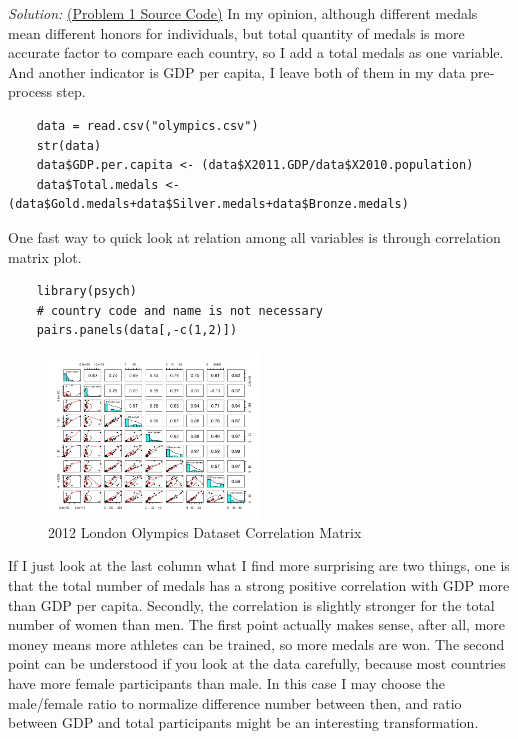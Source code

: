 \documentclass{article}
\newenvironment{solution}
    {\textit{Solution:}}
    {}
\begin{document}
\begin{solution}
\href{run:./src/RCode/p1.r}{ (Problem 1 Source Code)}
\newline
In my opinion, although different medals mean different honors for individuals, but total quantity of medals is more accurate factor to compare each country, so I add a total medals as one variable. And another indicator is GDP per capita, I leave both of them in my data pre-process step.
	\begin{lstlisting}
	data = read.csv("olympics.csv")
	str(data)
	data$GDP.per.capita <- (data$X2011.GDP/data$X2010.population)
	data$Total.medals <- (data$Gold.medals+data$Silver.medals+data$Bronze.medals)
	\end{lstlisting}
One fast way to quick look at relation among all variables is through correlation matrix plot.
	\begin{lstlisting}
	library(psych)
	# country code and name is not necessary
	pairs.panels(data[,-c(1,2)])
	\end{lstlisting}
	\begin{figure}[h]
		\centering
		\includegraphics[width=0.5\textwidth]{figure1_Rplot.jpeg}
		\caption{2012 London Olympics Dataset Correlation Matrix}
	\end{figure}
If I just look at the last column what I find more surprising are two things, one is that the total number of medals has a strong positive correlation with GDP more than GDP per capita. Secondly, the correlation is slightly stronger for the total number of women than men.
\newline
The first point actually makes sense, after all, more money means more athletes can be trained, so more medals are won. The second point can be understood if you look at the data carefully, because most countries have more female participants than male.
\newpage
In this case I may choose the male/female ratio to normalize difference number between then, and ratio between GDP and total participants might be an interesting transformation.
	\begin{lstlisting}

\end{lstlisting}
\end{solution}
\end{document}
